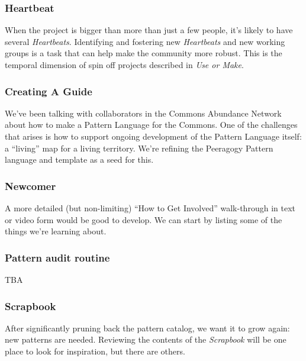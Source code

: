 \subsubsection*{Heartbeat} When the project is bigger than more than just a few people, it's likely to have several \emph{Heartbeats}.  Identifying and fostering new \emph{Heartbeats} and new working groups is a task that can help make the community more robust.  This is the temporal dimension of spin off projects described in \emph{Use or Make}.

\subsubsection*{Creating A Guide} We’ve been talking with collaborators in the Commons Abundance Network
about how to make a Pattern Language for the Commons. One of the
challenges that arises is how to support ongoing development of the
Pattern Language itself: a “living” map for a living territory. We’re
refining the Peeragogy Pattern language and template as a seed for this.

\subsubsection*{Newcomer} A more detailed (but non-limiting) ``How to Get Involved'' walk-through in text or video form would be good to develop. We can start by listing some of the things we're learning about.

\subsubsection*{Pattern audit routine}  TBA

\subsubsection*{Scrapbook} After significantly pruning back the pattern catalog, we want it to grow again: new patterns are needed.  Reviewing the contents of the \emph{Scrapbook} will be one place to look for inspiration, but there are others.



